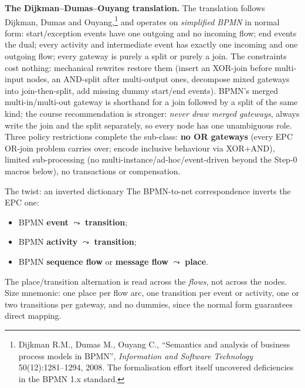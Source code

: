 \textbf{The Dijkman--Dumas--Ouyang translation.} The translation follows Dijkman, Dumas and Ouyang,\footnote{Dijkman R.M., Dumas M., Ouyang C., ``Semantics and analysis of business process models in BPMN'', \emph{Information and Software Technology} 50(12):1281--1294, 2008. The formalisation effort itself uncovered deficiencies in the BPMN 1.x standard.} and operates on \emph{simplified BPMN} in normal form: start/exception events have one outgoing and no incoming flow; end events the dual; every activity and intermediate event has exactly one incoming and one outgoing flow; every gateway is purely a split or purely a join. The constraints cost nothing: mechanical rewrites restore them (insert an XOR-join before multi-input nodes, an AND-split after multi-output ones, decompose mixed gateways into join-then-split, add missing dummy start/end events). BPMN's merged multi-in/multi-out gateway is shorthand for a join followed by a split of the same kind; the course recommendation is stronger: \emph{never draw merged gateways}, always write the join and the split separately, so every node has one unambiguous role. Three policy restrictions complete the sub-class: \textbf{no OR gateways} (every EPC OR-join problem carries over; encode inclusive behaviour via XOR+AND), limited sub-processing (no multi-instance/ad-hoc/event-driven beyond the Step-0 macros below), no transactions or compensation.

\begin{notebox}{The twist: an inverted dictionary}
The BPMN-to-net correspondence inverts the EPC one:
\begin{itemize}
  \item BPMN \textbf{event} $\leadsto$ \textbf{transition};
  \item BPMN \textbf{activity} $\leadsto$ \textbf{transition};
  \item BPMN \textbf{sequence flow} or \textbf{message flow} $\leadsto$ \textbf{place}.
\end{itemize}
The place/transition alternation is read across the \emph{flows}, not across the nodes. Size mnemonic: one place per flow arc, one transition per event or activity, one or two transitions per gateway, and no dummies, since the normal form guarantees direct mapping.
\end{notebox}

